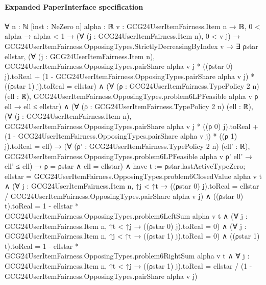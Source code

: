 \documentclass[10pt]{article}
\begin{document}
\paragraph{Expanded PaperInterface specification}
\begin{ReviewVerbatim}
∀ {n : ℕ} [inst : NeZero n] {alpha : ℝ} {v : GCG24UserItemFairness.Item n → ℝ},
  0 < alpha →
    alpha < 1 →
      (∀ (j : GCG24UserItemFairness.Item n), 0 < v j) →
        GCG24UserItemFairness.OpposingTypes.StrictlyDecreasingByIndex v →
          ∃ ρstar ellstar,
            (∀ (j : GCG24UserItemFairness.Item n),
                GCG24UserItemFairness.OpposingTypes.pairShare alpha v j * ((ρstar 0) j).toReal +
                    (1 - GCG24UserItemFairness.OpposingTypes.pairShare alpha v j) * ((ρstar 1) j).toReal =
                  ellstar) ∧
              (∀ (ρ : GCG24UserItemFairness.TypePolicy 2 n) (ell : ℝ),
                  GCG24UserItemFairness.OpposingTypes.problem6LPFeasible alpha v ρ ell → ell ≤ ellstar) ∧
                (∀ (ρ : GCG24UserItemFairness.TypePolicy 2 n) (ell : ℝ),
                    (∀ (j : GCG24UserItemFairness.Item n),
                        GCG24UserItemFairness.OpposingTypes.pairShare alpha v j * ((ρ 0) j).toReal +
                            (1 - GCG24UserItemFairness.OpposingTypes.pairShare alpha v j) * ((ρ 1) j).toReal =
                          ell) →
                      (∀ (ρ' : GCG24UserItemFairness.TypePolicy 2 n) (ell' : ℝ),
                          GCG24UserItemFairness.OpposingTypes.problem6LPFeasible alpha v ρ' ell' → ell' ≤ ell) →
                        ρ = ρstar ∧ ell = ellstar) ∧
                  have t := ρstar.lastActiveTypeZero;
                  ellstar = GCG24UserItemFairness.OpposingTypes.problem6ClosedValue alpha v t ∧
                    (∀ {j : GCG24UserItemFairness.Item n},
                        ↑j < ↑t →
                          ((ρstar 0) j).toReal = ellstar / GCG24UserItemFairness.OpposingTypes.pairShare alpha v j) ∧
                      ((ρstar 0) t).toReal =
                          1 - ellstar * GCG24UserItemFairness.OpposingTypes.problem6LeftSum alpha v t ∧
                        (∀ {j : GCG24UserItemFairness.Item n}, ↑t < ↑j → ((ρstar 0) j).toReal = 0) ∧
                          (∀ {j : GCG24UserItemFairness.Item n}, ↑j < ↑t → ((ρstar 1) j).toReal = 0) ∧
                            ((ρstar 1) t).toReal =
                                1 - ellstar * GCG24UserItemFairness.OpposingTypes.problem6RightSum alpha v t ∧
                              ∀ {j : GCG24UserItemFairness.Item n},
                                ↑t < ↑j →
                                  ((ρstar 1) j).toReal =
                                    ellstar / (1 - GCG24UserItemFairness.OpposingTypes.pairShare alpha v j)
\end{ReviewVerbatim}
\end{document}
